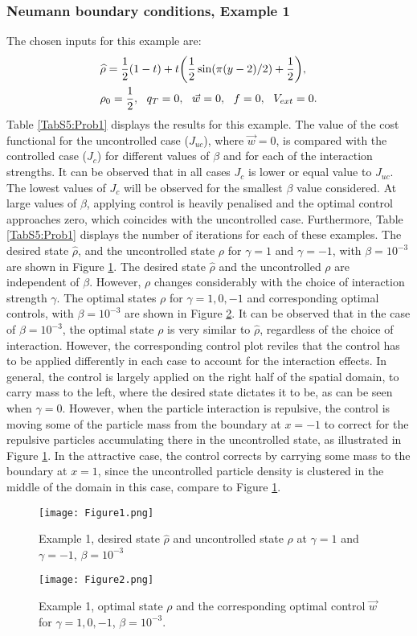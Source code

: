 \subsubsection{Neumann boundary conditions, Example 1}	 
The chosen inputs for this example are:
\begin{align*}
&\widehat \rho = \frac{1}{2}(1-t) + t\bigg(\frac{1}{2}\sin(\pi (y - 2)/2) + \frac{1}{2}\bigg),\\
&\rho_{0} = \frac{1}{2}, \ \
\adj_{T} = 0, \ \
\vec{w} = 0, \ \ 
f =0,\ \
V_{ext} =0.
\end{align*}	
Table \ref{TabS5:Prob1} displays the results for this example. The value of the cost functional for the uncontrolled case ($J_{uc}$), where $\vec{w} =0$, is compared with the controlled case ($J_{c}$) for different values of $\beta$ and for each of the interaction strengths. It can be observed that in all cases $J_{c}$ is lower or equal value to $J_{uc}$. The lowest values of $J_{c}$ will be observed for the smallest $\beta$ value considered. At large values of $\beta$, applying control is heavily penalised and the optimal control approaches zero, which coincides with the uncontrolled case. Furthermore, Table \ref{TabS5:Prob1} displays the number of iterations for each of these examples. The desired state $\widehat \rho$, and the uncontrolled state $\rho$ for $\gamma =1$ and $\gamma = -1$, with $\beta =10^{-3}$ are shown in Figure \ref{Ex12DN1}. The desired state $\hat \rho$ and the uncontrolled $\rho$ are independent of $\beta$. However, $\rho$ changes considerably with the choice of interaction strength $\gamma$. The optimal states $\rho$ for $\gamma = 1,0,-1$ and corresponding optimal controls, with $\beta = 10^{-3}$ are shown in Figure \ref{Ex12DN2}. 
It can be observed that in the case of $\beta = 10^{-3}$, the optimal state $\rho$ is very similar to $\hat \rho$, regardless of the choice of interaction. However, the corresponding control plot reviles that the control has to be applied differently in each case to account for the interaction effects. In general, the control is largely applied on the right half of the spatial domain, to carry mass to the left, where the desired state dictates it to be, as can be seen when $\gamma = 0$. However, when the particle interaction is repulsive, the control is moving some of the particle mass from the boundary at $x=-1$ to correct for the repulsive particles accumulating there in the uncontrolled state, as illustrated in Figure \ref{Ex12DN1}. In the attractive case, the control corrects by carrying some mass to the boundary at $x=1$, since the uncontrolled particle density is clustered in the middle of the domain in this case, compare to Figure \ref{Ex12DN1}.
\begin{figure}[h]
	\texttt{[image: Figure1.png]}
	\caption{Example 1, desired state $\widehat \rho$ and uncontrolled state $\rho$ at $\gamma =1$ and $\gamma =-1$, $\beta = 10^{-3}$}
	\label{Ex12DN1}
\end{figure}
\begin{figure}[h]
	\texttt{[image: Figure2.png]}
	\caption{Example 1, optimal state $\rho$ and the corresponding optimal control $\vec{w}$ for $\gamma = 1,0,-1$, $\beta = 10^{-3}$.}
	\label{Ex12DN2}
\end{figure}

